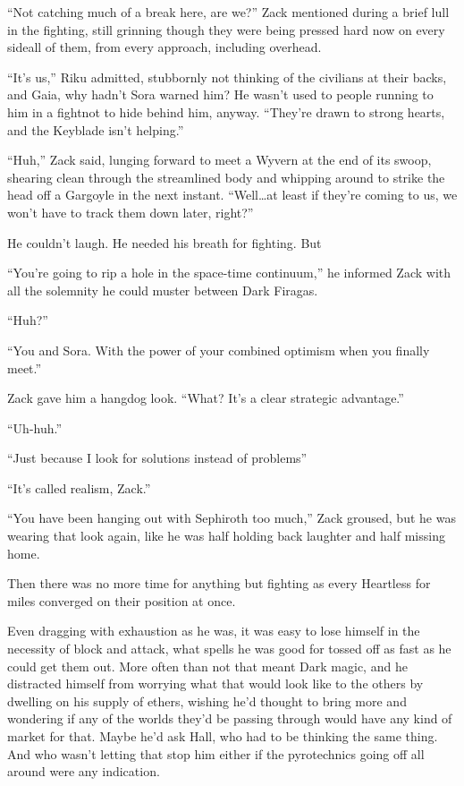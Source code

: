 ``Not catching much of a break here, are we?'' Zack mentioned during a brief lull in the fighting, still grinning though they were being pressed hard now on every side\textemdash all of them, from every approach, including overhead.

``It's us,'' Riku admitted, stubbornly not thinking of the civilians at their backs, and Gaia, why hadn't Sora warned him? He wasn't used to people running to him in a fight\textemdash not to hide behind him, anyway. ``They're drawn to strong hearts, and the Keyblade isn't helping.''

``Huh,'' Zack said, lunging forward to meet a Wyvern at the end of its swoop, shearing clean through the streamlined body and whipping around to strike the head off a Gargoyle in the next instant. ``Well\ldots at least if they're coming to us, we won't have to track them down later, right?''

He couldn't laugh. He needed his breath for fighting. But\textemdash 

``You're going to rip a hole in the space-time continuum,'' he informed Zack with all the solemnity he could muster between Dark Firagas.

``Huh?''

``You and Sora. With the power of your combined optimism when you finally meet.''

Zack gave him a hangdog look. ``What? It's a clear strategic advantage.''

``Uh-huh.''

``Just because I look for solutions instead of problems\textemdash ''

``It's called realism, Zack.''

``You have been hanging out with Sephiroth too much,'' Zack groused, but he was wearing that look again, like he was half holding back laughter and half missing home.

Then there was no more time for anything but fighting as every Heartless for miles converged on their position at once.

Even dragging with exhaustion as he was, it was easy to lose himself in the necessity of block and attack, what spells he was good for tossed off as fast as he could get them out. More often than not that meant Dark magic, and he distracted himself from worrying what that would look like to the others by dwelling on his supply of ethers, wishing he'd thought to bring more and wondering if any of the worlds they'd be passing through would have any kind of market for that. Maybe he'd ask Hall, who had to be thinking the same thing. And who wasn't letting that stop him either if the pyrotechnics going off all around were any indication.

